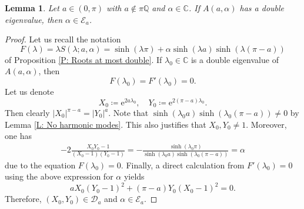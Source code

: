 \documentclass[11pt, a4paper,reqno]{amsart}
\theoremstyle{plain}
\newtheorem{lemma}[theorem]{Lemma}
\theoremstyle{definition}
\theoremstyle{remark}
\newcommand{\1}{\mathds 1}
\begin{document}
\begin{lemma}\label{L: Double eigenvalues are exceptional}
    Let $a \in (0, \pi)$ with $a \notin \pi \mathbb Q$ and $\alpha \in \mathbb C$. If $A(a, \alpha)$ has a double eigenvalue, then $\alpha \in \mathcal E_a$.
\end{lemma}
\begin{proof}
    Let us recall the notation 
    \[
    F(\lambda) = \lambda S(\lambda;a, \alpha) = \sinh(\lambda\pi) + \alpha\sinh(\lambda a)\sinh(\lambda(\pi-a))
    \]
    of Proposition \ref{P: Roots at most double}. If $\lambda_0 \in \mathbb C$ is a double eigenvalue of $A(a, \alpha)$, then
    \[
    F(\lambda_0) = F'(\lambda_0) = 0.
    \]
    Let us denote
    \[
    X_0 \coloneqq \mathrm{e}^{2a\lambda_0}, \quad Y_0 \coloneqq \mathrm{e}^{2(\pi-a)\lambda_0}.
    \]
    Then clearly $|X_0|^{\pi-a} = |Y_0|^a$. Note that $\sinh(\lambda_0 a)\sinh(\lambda_0 (\pi-a)) \neq 0$ by Lemma \ref{L: No harmonic modes}. This also justifies that $X_0, Y_0 \neq 1$.  Moreover, one has
    \begin{align*}
        -2\frac{X_0Y_0 - 1}{(X_0-1)(Y_0-1)} = - \frac{\sinh(\lambda_0\pi)}{\sinh(\lambda_0 a)\sinh(\lambda_0(\pi-a))} = \alpha
    \end{align*}
    due to the equation $F(\lambda_0) = 0$. Finally, a direct calculation from $F'(\lambda_0) = 0$ using the above expression for $\alpha$ yields
    \[
    aX_0(Y_0-1)^2 + (\pi-a)Y_0(X_0-1)^2 = 0.
    \]
    Therefore, $(X_0, Y_0) \in \mathcal D_a$ and $\alpha \in \mathcal E_a$.
\end{proof}

\end{document}
